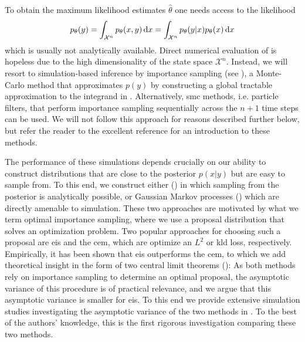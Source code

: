 To obtain the maximum likelihood estimates $\hat\theta$ one needs access to the likelihood
\begin{align}
    \label{eq:likelihood}
    p_{\theta}(y) = \int_{\mathcal X^n} p_{\theta}(x,y) \,\mathrm d x = \int_{\mathcal X^{n}} p_{\theta}(y|x) p_{\theta}(x) \,\mathrm d x
\end{align}
which is usually not analytically available.
Direct numerical evaluation of  is hopeless due to the high dimensionality of the state space $\mathcal X^n$.
Instead, we will resort to simulation-based inference by importance sampling (see ), a Monte-Carlo method that approximates $p(y)$ by constructing a global tractable approximation to the integrand in . Alternatively, \gls{smc} methods, i.e. particle filters, that perform importance sampling sequentially across the $n + 1$ time steps can be used. We will not follow this approach for reasons described further below, but refer the reader to the excellent reference \citep{Chopin2020Introduction} for an introduction to these methods.

The performance of these simulations depends crucially on our ability to construct distributions that are close to the posterior $p(x|y)$ but are easy to sample from. To this end, we construct either  () in which sampling from the posterior is analytically possible, or Gaussian Markov processes () which are directly amenable to simulation.
These two approaches are motivated by what we term \glqq{}optimal importance sampling\grqq{}, where we use a proposal distribution that solves an optimization problem. Two popular approaches for choosing such a proposal are \acrlong{eis} and the \acrlong{cem}, which are optimize an $L^{2}$ or \acrshort{kld} loss, respectively. Empirically, it has been shown that \acrshort{eis} outperforms the \acrshort{cem}, to which we add theoretical insight in the form of two central limit theorems (): As both methods rely on importance sampling to determine an optimal proposal, the asymptotic variance of this procedure is of practical relevance, and we argue that this asymptotic variance is smaller for \acrshort{eis}.
To this end we provide extensive simulation studies investigating the asymptotic variance of the two methods in . 
To the best of the authors' knowledge, this is the first rigorous investigation comparing these two methods. 

